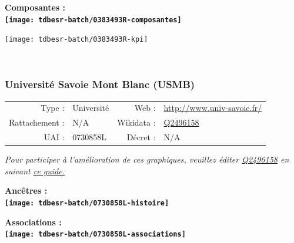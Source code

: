 \documentclass[12pt,french,]{article}
\begin{document}
\hrulefill

\begin{center} \bf Composantes : \\  
\texttt{[image: tdbesr-batch/0383493R-composantes]} \end{center}

\begin{center}\texttt{[image: tdbesr-batch/0383493R-kpi]} \end{center}\checkoddpage

\ifoddpage ~\newpage \fi   

\hypertarget{universituxe9-savoie-mont-blanc-usmb}{%
\subsubsection{Université Savoie Mont Blanc
(USMB)}\label{universituxe9-savoie-mont-blanc-usmb}}

\begin{tabular*}{\textwidth}{rp{5cm}rl}  
\hline  
Type : & Université & Web : &\href{http://www.univ-savoie.fr/}{http://www.univ-savoie.fr/} \\  
Rattachement : & N/A & Wikidata : & \href{https://www.wikidata.org/entity/Q2496158}{Q2496158} \\  
UAI : & 0730858L & Décret : & N/A \\  
\hline  
\end{tabular*}

\textit{\scriptsize Pour participer à l'amélioration de ces graphiques, veuillez éditer  \href{https://www.wikidata.org/entity/Q2496158}{Q2496158}  en suivant \href{https://github.com/cpesr/wikidataESR/blob/master/Rmd/wikidataESR.md}{ce guide.}}

\vspace{1cm}  
\begin{minipage}[b]{0.50\textwidth}\begin{center} \bf Ancêtres : \\  
\texttt{[image: tdbesr-batch/0730858L-histoire]} \end{center}\end{minipage}\begin{minipage}[b]{0.50\textwidth}\begin{center} \bf Associations : \\  
\texttt{[image: tdbesr-batch/0730858L-associations]} \end{center}\end{minipage}

\hrulefill
\end{document}
